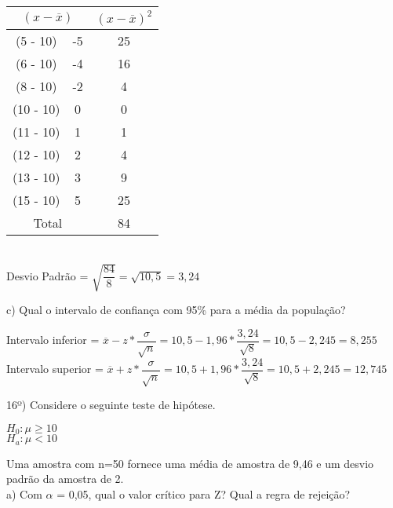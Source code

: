 \documentclass[12pt,a4paper]{article}
\begin{document}
	\begin{center}
		\begin{center}
			\begin{tabular}{|c|c|c|} \hline
				\multicolumn{2}{|c|}{$(x - \overline{x})$} & $(x - \overline{x})^2$\\ \hline
				(5 - 10) & -5 & 25\\ \hline
				(6 - 10) & -4 & 16\\ \hline
				(8 - 10) & -2 & 4\\ \hline
				(10 - 10) & 0 & 0\\ \hline
				(11 - 10) & 1 & 1\\ \hline
				(12 - 10) & 2 & 4\\ \hline
				(13 - 10) & 3 & 9\\ \hline
				(15 - 10) & 5 & 25\\ \hline
				\multicolumn{2}{|c|}{Total} & 84\\ \hline
			\end{tabular}
			\vspace{0.5cm}\\
			Desvio Padrão = $\sqrt{\dfrac{84}{8}} = \sqrt{10,5} = 3,24$
		\end{center}
	\end{center}
	\vspace{1cm}
	c) Qual o intervalo de confiança com 95\% para a média da população?
	\vspace{0.5cm}
	\begin{center}
		Intervalo inferior = $\overline{x} - z*\dfrac{\sigma}{\sqrt{n}} = 10,5 - 1,96*\dfrac{3,24}{\sqrt{8}} = 10,5 - 2,245 = 8,255$
		\vspace{0.5cm}\\
		Intervalo superior = $\overline{x} + z*\dfrac{\sigma}{\sqrt{n}} = 10,5 + 1,96*\dfrac{3,24}{\sqrt{8}} = 10,5 + 2,245 = 12,745$
	\end{center}
	\vspace{1cm}
	16º) Considere o seguinte teste de hipótese.\\
	\begin{center}
		$\mathit{H}_{0} : \mu \geq 10$\\
		$\mathit{H}_{a} : \mu < 10$
	\end{center}
	Uma amostra com n=50 fornece uma média de amostra de 9,46 e um desvio padrão da amostra de 2.\\
	a) Com $\alpha$ = 0,05, qual o valor crítico para Z? Qual a regra de rejeição?
	\vspace{0.5cm}\\
\end{document}
